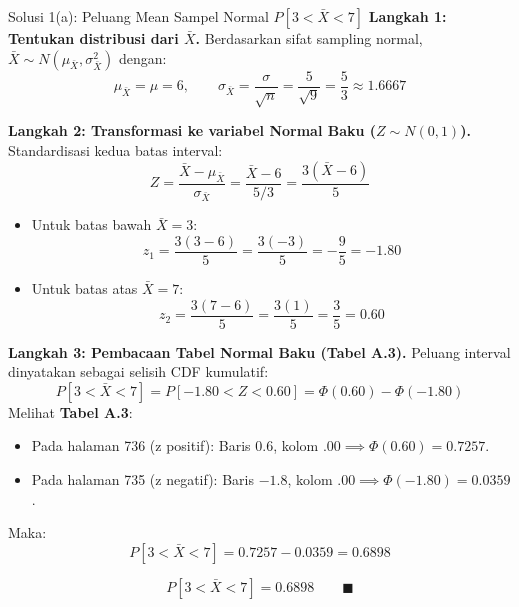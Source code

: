 \documentclass[10pt,twoside]{article}
\begin{document}
\begin{solbox}{Solusi 1(a): Peluang Mean Sampel Normal $P[3 < \bar{X} < 7]$}
\textbf{Langkah 1: Tentukan distribusi dari $\bar{X}$.}
Berdasarkan sifat sampling normal, $\bar{X} \sim N\left(\mu_{\bar{X}}, \sigma_{\bar{X}}^2\right)$ dengan:
\[
\mu_{\bar{X}} = \mu = 6, \qquad \sigma_{\bar{X}} = \frac{\sigma}{\sqrt{n}} = \frac{5}{\sqrt{9}} = \frac{5}{3} \approx 1.6667
\]

\textbf{Langkah 2: Transformasi ke variabel Normal Baku ($Z \sim N(0, 1)$).}
Standardisasi kedua batas interval:
\[
Z = \frac{\bar{X} - \mu_{\bar{X}}}{\sigma_{\bar{X}}} = \frac{\bar{X} - 6}{5/3} = \frac{3(\bar{X} - 6)}{5}
\]
\begin{itemize}
  \item Untuk batas bawah $\bar{X} = 3$:
    \[
    z_1 = \frac{3(3 - 6)}{5} = \frac{3(-3)}{5} = -\frac{9}{5} = -1.80
    \]
  \item Untuk batas atas $\bar{X} = 7$:
    \[
    z_2 = \frac{3(7 - 6)}{5} = \frac{3(1)}{5} = \frac{3}{5} = 0.60
    \]
\end{itemize}

\textbf{Langkah 3: Pembacaan Tabel Normal Baku (Tabel A.3).}
Peluang interval dinyatakan sebagai selisih CDF kumulatif:
\[
P[3 < \bar{X} < 7] = P[-1.80 < Z < 0.60] = \Phi(0.60) - \Phi(-1.80)
\]
Melihat \textbf{Tabel A.3}:
\begin{itemize}
  \item Pada halaman 736 (z positif): Baris $0.6$, kolom $.00 \implies \Phi(0.60) = \mathbf{0.7257}$.
  \item Pada halaman 735 (z negatif): Baris $-1.8$, kolom $.00 \implies \Phi(-1.80) = \mathbf{0.0359}$.
\end{itemize}
Maka:
\[
P[3 < \bar{X} < 7] = 0.7257 - 0.0359 = 0.6898
\]

\[
\boxed{P[3 < \bar{X} < 7] = 0.6898} \qquad \blacksquare
\]
\end{solbox}
\end{document}
